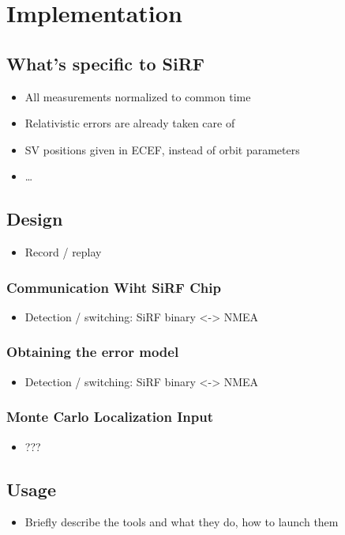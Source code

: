 \chapter{Implementation}
\label{chap:implementation}

\section{What's specific to SiRF}
\begin{itemize}
\item All measurements normalized to common time
\item Relativistic errors are already taken care of
\item SV positions given in ECEF, instead of orbit parameters
\item \ldots
\end{itemize}

\section{Design}
\begin{itemize}
\item Record / replay
\end{itemize}

\subsection{Communication Wiht SiRF Chip}
\begin{itemize}
\item Detection / switching: SiRF binary <-> NMEA
\end{itemize}

\subsection{Obtaining the error model}
\begin{itemize}
\item Detection / switching: SiRF binary <-> NMEA
\end{itemize}

\subsection{Monte Carlo Localization Input}
\begin{itemize}
\item ???
\end{itemize}

\section{Usage}
\begin{itemize}
\item Briefly describe the tools and what they do, how to launch them
\end{itemize}
